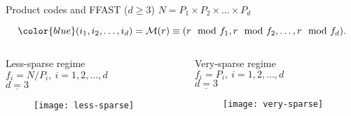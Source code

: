 	\begin{frame}{Product codes and FFAST ($d \geq 3$)}
	\color{blue}$N= P_1 \times P_2 \times \ldots \times P_d$
	
	\[\color{blue} (i_1,i_2,\ldots, i_d) = \mathcal{M}(r) \equiv (r \mod f_1, r \mod f_2, \ldots, r \mod f_d ).
	\]
	
	\begin{columns}
		\begin{block}{Less-sparse regime}
			\color{red} $f_i= N/P_i,\ i=1,2, \ldots,d$\\ \vspace{0.2in}
			\vspace{-2mm}
			\color{blue} $\underline{d=3}$
			\vspace{-3mm}
			\begin{figure}[t]
				\centering
				\texttt{[image: less-sparse]}
			\end{figure}
			
		\end{block}
		\begin{block}{Very-sparse regime}
			\color{red} $f_i= P_i,\ i=1,2, \ldots,d$\\ \vspace{0.2in}
			\vspace{-2mm}
			\color{blue} $\underline{d=3}$
			\vspace{-3mm}
			\begin{figure}[t]
				\centering
				\texttt{[image: very-sparse]}
			\end{figure}
			
		\end{block}
	\end{columns}
		
		
	\end{frame}
